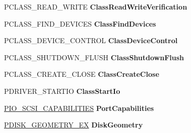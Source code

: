 \begin{DoxyCompactItemize}
P\+C\+L\+A\+S\+S\+\_\+\+R\+E\+A\+D\+\_\+\+W\+R\+I\+TE {\bfseries Class\+Read\+Write\+Verification}
\item 
\mbox{\label{struct___d_e_v_i_c_e___e_x_t_e_n_s_i_o_n_af80f6725c5b46bfd390c984a3dc7af8d}} 
P\+C\+L\+A\+S\+S\+\_\+\+F\+I\+N\+D\+\_\+\+D\+E\+V\+I\+C\+ES {\bfseries Class\+Find\+Devices}
\item 
\mbox{\label{struct___d_e_v_i_c_e___e_x_t_e_n_s_i_o_n_aa47bef96cf5e403444114183a90f7778}} 
P\+C\+L\+A\+S\+S\+\_\+\+D\+E\+V\+I\+C\+E\+\_\+\+C\+O\+N\+T\+R\+OL {\bfseries Class\+Device\+Control}
\item 
\mbox{\label{struct___d_e_v_i_c_e___e_x_t_e_n_s_i_o_n_ad98b4f925a88ffbda4e1e66295102354}} 
P\+C\+L\+A\+S\+S\+\_\+\+S\+H\+U\+T\+D\+O\+W\+N\+\_\+\+F\+L\+U\+SH {\bfseries Class\+Shutdown\+Flush}
\item 
\mbox{\label{struct___d_e_v_i_c_e___e_x_t_e_n_s_i_o_n_af8444050ad5cfed279a5b00ee13bb91b}} 
P\+C\+L\+A\+S\+S\+\_\+\+C\+R\+E\+A\+T\+E\+\_\+\+C\+L\+O\+SE {\bfseries Class\+Create\+Close}
\item 
\mbox{\label{struct___d_e_v_i_c_e___e_x_t_e_n_s_i_o_n_a8aae8957b625065110365e71a41b0e0b}} 
P\+D\+R\+I\+V\+E\+R\+\_\+\+S\+T\+A\+R\+T\+IO {\bfseries Class\+Start\+Io}
\item 
\mbox{\label{struct___d_e_v_i_c_e___e_x_t_e_n_s_i_o_n_a822b9d9c29b382f17c15482c40b32598}} 
\hyperlink{struct___i_o___s_c_s_i___c_a_p_a_b_i_l_i_t_i_e_s}{P\+I\+O\+\_\+\+S\+C\+S\+I\+\_\+\+C\+A\+P\+A\+B\+I\+L\+I\+T\+I\+ES} {\bfseries Port\+Capabilities}
\item 
\mbox{\label{struct___d_e_v_i_c_e___e_x_t_e_n_s_i_o_n_afe30971048e9ce116e9fccb71c1115d0}} 
\hyperlink{struct___d_i_s_k___g_e_o_m_e_t_r_y___e_x}{P\+D\+I\+S\+K\+\_\+\+G\+E\+O\+M\+E\+T\+R\+Y\+\_\+\+EX} {\bfseries Disk\+Geometry}
\item 
\mbox{\label{struct___d_e_v_i_c_e___e_x_t_e_n_s_i_o_n_a669962ca2ca047e3ebd4ca692e9d75e9}} 

\end{DoxyCompactItemize}
